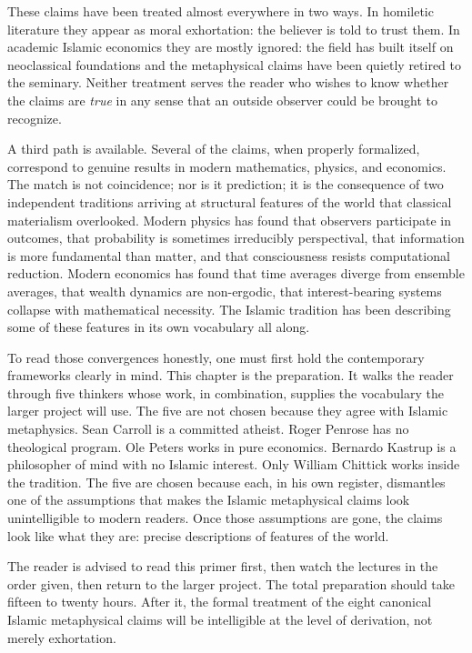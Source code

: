 \documentclass[11pt,a4paper]{book}
\theoremstyle{cleanrm}
\begin{document}
These claims have been treated almost everywhere in two ways. In
homiletic literature they appear as moral exhortation: the believer is
told to trust them. In academic Islamic economics they are mostly
ignored: the field has built itself on neoclassical foundations and the
metaphysical claims have been quietly retired to the seminary. Neither
treatment serves the reader who wishes to know whether the claims are
\emph{true} in any sense that an outside observer could be brought to
recognize.

A third path is available. Several of the claims, when properly
formalized, correspond to genuine results in modern mathematics,
physics, and economics. The match is not coincidence; nor is it
prediction; it is the consequence of two independent traditions
arriving at structural features of the world that classical materialism
overlooked. Modern physics has found that observers participate in
outcomes, that probability is sometimes irreducibly perspectival, that
information is more fundamental than matter, and that consciousness
resists computational reduction. Modern economics has found that time
averages diverge from ensemble averages, that wealth dynamics are
non-ergodic, that interest-bearing systems collapse with mathematical
necessity. The Islamic tradition has been describing some of these
features in its own vocabulary all along.

To read those convergences honestly, one must first hold the
contemporary frameworks clearly in mind. This chapter is the
preparation. It walks the reader through five thinkers whose work, in
combination, supplies the vocabulary the larger project will use. The
five are not chosen because they agree with Islamic metaphysics. Sean
Carroll is a committed atheist. Roger Penrose has no theological
program. Ole Peters works in pure economics. Bernardo Kastrup is a
philosopher of mind with no Islamic interest. Only William Chittick
works inside the tradition. The five are chosen because each, in his
own register, dismantles one of the assumptions that makes the Islamic
metaphysical claims look unintelligible to modern readers. Once those
assumptions are gone, the claims look like what they are: precise
descriptions of features of the world.

The reader is advised to read this primer first, then watch the
lectures in the order given, then return to the larger project. The
total preparation should take fifteen to twenty hours. After it, the
formal treatment of the eight canonical Islamic metaphysical claims
will be intelligible at the level of derivation, not merely
exhortation.
\end{document}
